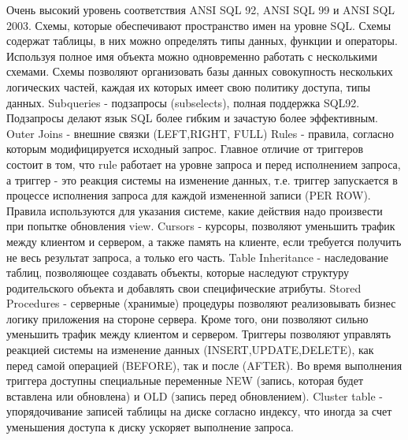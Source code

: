 Очень высокий уровень соответствия ANSI SQL 92, ANSI SQL 99 и ANSI SQL 2003.
Схемы, которые обеспечивают пространство имен на уровне SQL. Схемы содержат таблицы, в них можно определять типы данных, функции и операторы. Используя полное имя объекта можно одновременно работать с несколькими схемами. Схемы позволяют организовать базы данных совокупность нескольких логических частей, каждая их которых имеет свою политику доступа, типы данных.
Subqueries - подзапросы (subselects), полная поддержка SQL92. Подзапросы делают язык SQL более гибким и зачастую более эффективным.
Outer Joins - внешние связки (LEFT,RIGHT, FULL)
Rules - правила, согласно которым модифицируется исходный запрос. Главное отличие от триггеров состоит в том, что rule работает на уровне запроса и перед исполнением запроса, а триггер - это реакция системы на изменение данных, т.е. триггер запускается в процессе исполнения запроса для каждой измененной записи (PER ROW). Правила используются для указания системе, какие действия надо произвести при попытке обновления view.
Cursors - курсоры, позволяют уменьшить трафик между клиентом и сервером, а также память на клиенте, если требуется получить не весь результат запроса, а только его часть.
Table Inheritance - наследование таблиц, позволяющее создавать объекты, которые наследуют структуру родительского объекта и добавлять свои специфические атрибуты.
Stored Procedures - серверные (хранимые) процедуры позволяют реализовывать бизнес логику приложения на стороне сервера. Кроме того, они позволяют сильно уменьшить трафик между клиентом и сервером.
Триггеры позволяют управлять реакцией системы на изменение данных (INSERT,UPDATE,DELETE), как перед самой операцией (BEFORE), так и после (AFTER). Во время выполнения триггера доступны специальные переменные NEW (запись, которая будет вставлена или обновлена) и OLD (запись перед обновлением).
Cluster table - упорядочивание записей таблицы на диске согласно индексу, что иногда за счет уменьшения доступа к диску ускоряет выполнение запроса.

